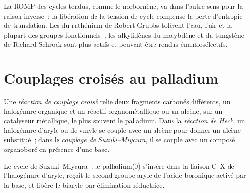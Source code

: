 La ROMP des cycles tendus, comme le norbornène, va dans l'autre sens pour
la raison inverse~: la libération de la tension de cycle compense la perte
d'entropie de translation. Les  du ruthénium de Robert Grubbs
tolèrent l'eau, l'air et la plupart des groupes fonctionnels~; les
alkylidènes du molybdène et du tungstène de Richard Schrock sont plus
actifs et peuvent être rendus énantiosélectifs.

\section{Couplages croisés au palladium}

\begin{definition}\label{def:b3:homogeneous-catalysis:cross-coupling}
Une \emph{réaction de couplage croisé} relie deux
fragments carbonés différents, un halogénure organique et un réactif
organométallique ou un alcène, sur un catalyseur métallique, le plus souvent
le palladium. Dans la \emph{réaction de Heck}, un halogénure d'aryle ou de
vinyle se couple avec un alcène pour donner un alcène substitué~; dans le
\emph{couplage de Suzuki--Miyaura}, il se couple avec un composé
organoboré en présence d'une base.
\end{definition}

\begin{omfigure}

{\small Le cycle de Suzuki--Miyaura~: le palladium(0) s'insère dans la
liaison C--X de l'halogénure d'aryle, reçoit le second groupe aryle de
l'acide boronique activé par la base, et libère le biaryle par élimination
réductrice.}
\end{omfigure}

